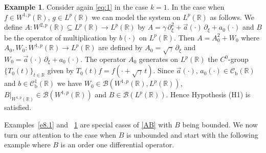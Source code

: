 \documentclass[11pt]{amsart}
\numberwithin{equation}{section}
\newcommand\R{\mathbb R}
\newcommand{\rmb}{{\mathrm{b}}}
\theoremstyle{remark}
\theoremstyle{definition}
\newtheorem{example}[theorem]{Example}
\begin{document}
\begin{example}\label{e8.2}
	Consider again \eqref{eq:1} in the case $k=1$. In the case when $f \in W^{1,p}(\R)$,
	$g \in L^p(\R)$ we can model the system on $L^p(\R)$ as follows. We define
	$A: W^{2,p}(\R) \subseteq L^p(\R) \to L^p(\R)$ by
	$A = \gamma\,\partial_\xi^2 + \vec{a}(\cdot)\,\partial_\xi + a_0(\cdot)$ and $B$ be the operator
	of multiplication by $b(\cdot)$ on $L^p(\R)$. Then $A = A_0 ^2+ W_0$ where
	$A_0, W_0: W^{1,p}(\R) \to L^p(\R)$ are defined by $A_0 = \sqrt{\gamma}\,\partial_\xi$ and
	$W_0 = \vec{a}(\cdot)\,\partial_\xi + a_0(\cdot)$. The operator $A_0$ generates on $L^p(\R)$ the $C^0$-group $\{T_0(t)\}_{t\in\R}$ given by
	$T_0(t)f = f(\cdot + \sqrt{\gamma}\,t)$. Since $\vec{a}(\cdot),\,a_0(\cdot) \in \mathcal{C}_\rmb(\R)$
	and $b \in \mathcal{C}_\rmb^1(\R)$ we have $W_0 \in \mathcal{B}(W^{1,p}(\R), L^p(\R))$,
	$B\big|_{W^{1,p}(\R)} \in \mathcal{B}(W^{1,p}(\R))$ and $B \in \mathcal{B}(L^p(\R))$. Hence Hypothesis (H1) is satisfied. 	
\end{example}	
Examples~\ref{e8.1} and ~\ref{e8.2} are special cases of \eqref{AB} with $B$ being bounded. We now turn our attention to the case when $B$ is unbounded and start with the following example where $B$ is an order one differential operator.	
\end{document}
